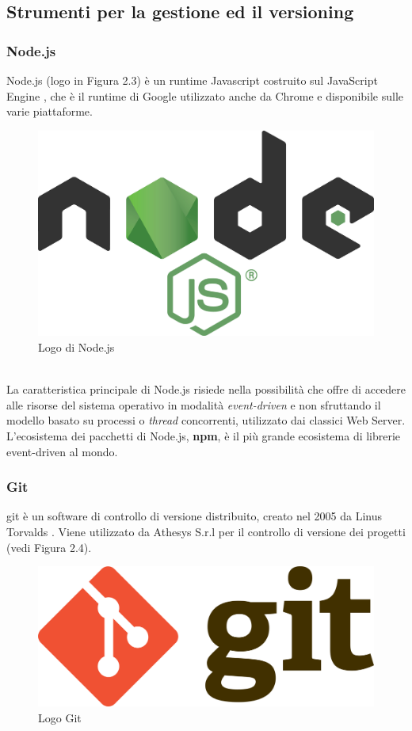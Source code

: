 \subsection{Strumenti per la gestione ed il versioning}
\subsubsection{Node.js}
Node.js (logo in Figura 2.3) è un runtime Javascript costruito sul JavaScript Engine \cite{nodeGuida}, che è il runtime di Google utilizzato anche da Chrome e disponibile sulle varie piattaforme.
\begin{figure}[h]
	\centering
	\includegraphics[scale=0.05]{immagini/nodejs}
	\caption{Logo di Node.js}
\end{figure}
\\
La caratteristica principale di Node.js risiede nella possibilità che offre di accedere alle risorse del sistema operativo in modalità \emph{\gls{event-driven}}\glsfirstoccur\cite{nodeEvent} e non sfruttando il modello basato su processi o \textit{thread} concorrenti, utilizzato dai classici Web Server. L'ecosistema dei pacchetti di Node.js, \textbf{npm}, è il più grande ecosistema di librerie \gls{event-driven} al mondo.
\subsubsection{Git}
\gls{git} è un software di controllo di versione distribuito, creato nel 2005 da Linus Torvalds \cite{gitSite}. Viene utilizzato da Athesys S.r.l per il controllo di versione dei progetti (vedi Figura 2.4).
\begin{figure}[h]
	\centering
	\includegraphics[scale=0.05]{immagini/git}
	\caption{Logo Git}
\end{figure}

